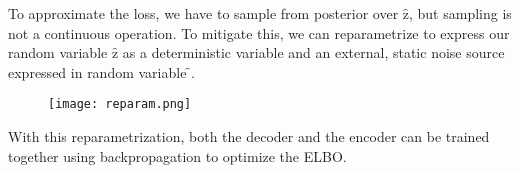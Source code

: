 To approximate the loss, we have to sample from posterior over \f{z}, but sampling is not a
continuous operation. To mitigate this, we can reparametrize to express our random variable \f{z} as a deterministic variable and an external, static noise source expressed in random variable \f{\epsilon}.

\begin{figure}[h!]
    \centering
    \texttt{[image: reparam.png]}
\end{figure}

With this reparametrization, both the decoder and the encoder can be trained together using backpropagation to optimize the ELBO.